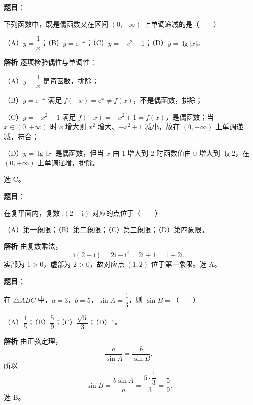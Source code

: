 \begin{answer}

\textbf{题目}：

下列函数中，既是偶函数又在区间 $(0,+\infty)$ 上单调递减的是\mbox{（　　）}

（A）$y=\dfrac1x$；（B）$y=\mathrm e^{-x}$；（C）$y=-x^2+1$；（D）$y=\lg|x|$。

\textbf{解析}
逐项检验偶性与单调性：

（A）$y=\dfrac1x$ 是奇函数，排除；

（B）$y=\mathrm e^{-x}$ 满足 $f(-x)=\mathrm e^{x}\neq f(x)$，不是偶函数，排除；

（C）$y=-x^2+1$ 满足 $f(-x)=-x^2+1=f(x)$，是偶函数；当 $x\in(0,+\infty)$ 时 $x$ 增大则 $x^2$ 增大、$-x^2+1$ 减小，故在 $(0,+\infty)$ 上单调递减，符合；

（D）$y=\lg|x|$ 是偶函数，但当 $x$ 由 $1$ 增大到 $2$ 时函数值由 $0$ 增大到 $\lg2$，在 $(0,+\infty)$ 上单调递增，排除。

选 C。


\end{answer}
\begin{answer}

\textbf{题目}：

在复平面内，复数 $\mathrm i(2-\mathrm i)$ 对应的点位于\mbox{（　　）}

（A）第一象限；（B）第二象限；（C）第三象限；（D）第四象限。

\textbf{解析}
由复数乘法，
\nopagebreak[4]
\[\mathrm i(2-\mathrm i)=2\mathrm i-\mathrm i^2=2\mathrm i+1=1+2\mathrm i.\]
实部为 $1>0$，虚部为 $2>0$，故对应点 $(1,2)$ 位于第一象限。选 A。


\end{answer}
\begin{answer}

\textbf{题目}：

在 $\triangle ABC$ 中，$a=3$，$b=5$，$\sin A=\dfrac13$，则 $\sin B=$\mbox{（　　）}

（A）$\dfrac15$；（B）$\dfrac59$；（C）$\dfrac{\sqrt5}3$；（D）$1$。

\textbf{解析}
由正弦定理，
\nopagebreak[4]
\[\frac{a}{\sin A}=\frac{b}{\sin B},\]
所以
\nopagebreak[4]
\[\sin B=\frac{b\sin A}{a}=\frac{5\cdot\dfrac13}{3}=\frac59.\]
选 B。


\end{answer}
